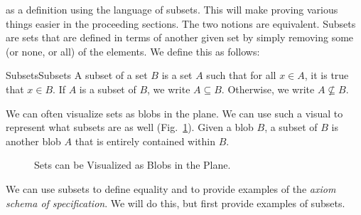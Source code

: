         as a definition using the language of subsets. This will make
        proving various things easier in the proceeding sections. The
        two notions are equivalent.
        Subsets are sets that are defined in terms of another given set
        by simply removing some (or none, or all) of the elements.
        We define this as follows:
        \begin{fdefinition}{Subsets}{Subsets}
            A \gls{subset} of a \gls{set} $B$ is a set $A$ such that for all
            $x\in{A}$, it is true that $x\in{B}$. If $A$ is a subset
            of $B$, we write $A\subseteq{B}$. Otherwise, we write
            $A\nsubseteq{B}$.
        \end{fdefinition}
        We can often visualize sets as blobs in the plane. We can use
        such a visual to represent what subsets are as well
        (Fig.~\ref{fig:Subset_Blobs}). Given a blob $B$, a subset of
        $B$ is another blob $A$ that is entirely contained within $B$.
        \begin{figure}[H]
            \centering
            
            \caption[Visual for Subsets]
                    {Sets can be Visualized as Blobs in the Plane.}
            \label{fig:Subset_Blobs}
        \end{figure}
        We can use subsets to define equality and to provide examples
        of the \textit{axiom schema of specification}. We will do this,
        but first provide examples of subsets.
